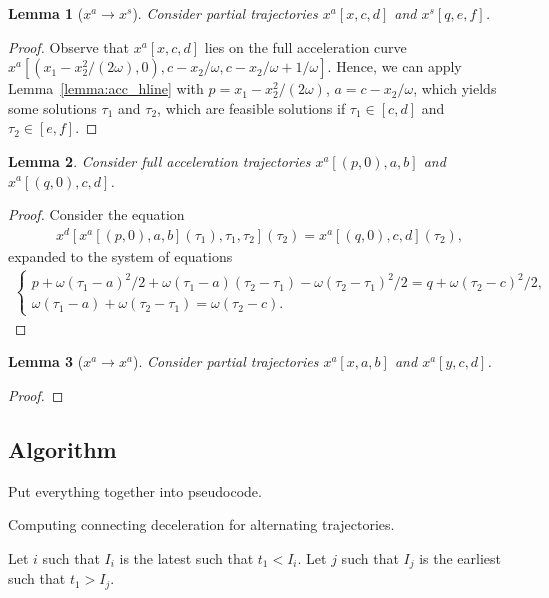 \documentclass[a4paper]{article}
\theoremstyle{definition}
\theoremstyle{plain}
\newtheorem{lemma}{Lemma\hspace{0.25em}\ignorespaces}
\begin{document}
\begin{lemma}[$x^{a} \rightarrow x^{s}$]
  Consider partial trajectories $x^{a}[x, c, d]$ and $x^{s}[q, e, f]$.
\end{lemma}
\begin{proof}
  Observe that $x^{a}[x, c, d]$ lies on the full acceleration curve
  $x^{a}[(x_{1} - x_{2}^{2}/(2\omega), 0), c - x_{2}/\omega, c - x_{2}/\omega + 1/\omega]$.
  Hence, we can apply Lemma~\ref{lemma:acc_hline} with
  $p=x_{1} - x_{2}^{2}/(2 \omega)$, $a = c - x_{2}/\omega$, which yields some
  solutions $\tau_{1}$ and $\tau_{2}$, which are feasible solutions if
  $\tau_{1} \in [c, d]$ and $\tau_{2} \in [e, f]$.
\end{proof}

\begin{lemma}
  Consider full acceleration trajectories $x^{a}[(p, 0), a, b]$ and
  $x^{a}[(q, 0), c, d]$.
\end{lemma}
\begin{proof}
  Consider the equation
  \begin{align*}
    x^{d}[x^{a}[(p, 0), a, b](\tau_{1}), \tau_{1}, \tau_{2}](\tau_{2}) = x^{a}[(q, 0), c, d](\tau_{2}) ,
  \end{align*}
  expanded to the system of equations
  \begin{align*}
    \begin{cases}
      p + \omega(\tau_{1} - a)^{2}/2 + \omega(\tau_{1} - a)(\tau_{2} - \tau_{1}) - \omega(\tau_{2} - \tau_{1})^{2}/2 = q + \omega(\tau_{2} - c)^{2}/2 , \\
      \omega(\tau_{1} - a) + \omega(\tau_{2} - \tau_{1}) = \omega(\tau_{2} - c) .
    \end{cases}
  \end{align*}
\end{proof}

\begin{lemma}[$x^{a} \rightarrow x^{a}$]
  Consider partial trajectories $x^{a}[x, a, b]$ and $x^{a}[y, c, d]$.
\end{lemma}
\begin{proof}

\end{proof}

\subsection{Algorithm}

Put everything together into pseudocode.

\begin{algorithm}
  \caption{Computing connecting deceleration for alternating trajectories.}
    \label{alg:connecting}
    \begin{algorithmic}
      \State Let $i$ such that $I_{i}$ is the latest such that $t_{1} < I_{i}$.
      \State Let $j$ such that $I_{j}$ is the earliest such that $t_{1} > I_{j}$.
    \end{algorithmic}
\end{algorithm}
\end{document}
